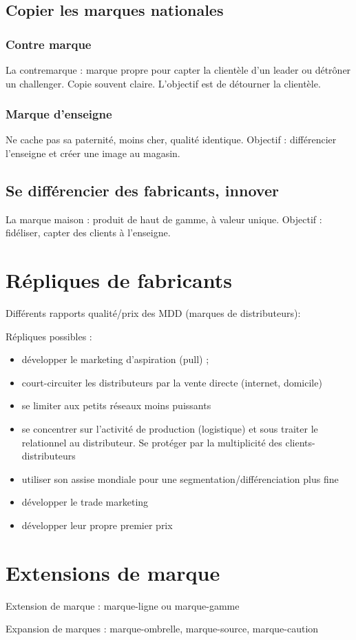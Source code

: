 		
		\subsection{Copier les marques nationales}
		
			\subsubsection{Contre marque}
			La contremarque : marque propre pour capter la clientèle d'un leader ou détrôner un challenger. Copie souvent claire. L'objectif est de détourner la clientèle.
		
			\subsubsection{Marque d'enseigne}
			
			Ne cache pas sa paternité, moins cher, qualité identique. Objectif : différencier l'enseigne et créer une image au magasin.
		
		\subsection{Se différencier des fabricants, innover}
		
		La marque maison : produit de haut de gamme, à valeur unique. Objectif : fidéliser, capter des clients à l'enseigne.
		

	
	\section{Répliques de fabricants}
	
	Différents rapports qualité/prix des MDD (marques de distributeurs):
		
	Répliques possibles :
		
	\begin{itemize}
		\item développer le marketing d'aspiration (pull) ;
		\item court-circuiter les distributeurs par la vente directe (internet, domicile)
		\item se limiter aux petits réseaux moins puissants
		\item se concentrer sur l'activité de production (logistique) et sous traiter le relationnel au distributeur. Se protéger par la multiplicité des clients-distributeurs
		\item utiliser son assise mondiale pour une segmentation/différenciation plus fine
		\item développer le trade marketing
		\item développer leur propre premier prix
	\end{itemize}	
		
	
	\section{Extensions de marque}
	
	Extension de marque : marque-ligne ou marque-gamme 
	
	Expansion de marques : marque-ombrelle, marque-source, marque-caution
	
	

